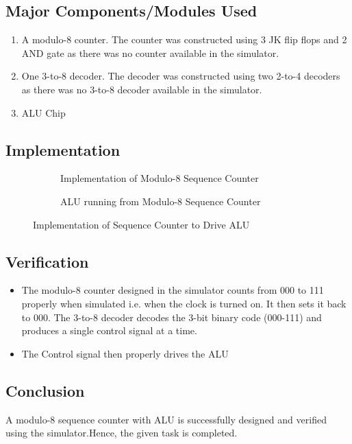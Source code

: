 \documentclass[a4paper]{article}
\begin{document}
\subsection{Major Components/Modules Used}
\begin{enumerate}
    \item A modulo-8 counter. The counter was constructed using 3 JK flip flops and 2 AND gate as there was no counter available in the simulator.
    \item One 3-to-8 decoder. The decoder was constructed using two 2-to-4 decoders as there was no 3-to-8 decoder available in the simulator.
    \item ALU Chip
\end{enumerate}

\subsection{Implementation}
\begin{figure}[h!]
    \centering
    \begin{subfigure}[b]{\linewidth}
        \centering
        \caption{Implementation of Modulo-8 Sequence Counter}
    \end{subfigure}
    \begin{subfigure}[b]{\linewidth}
        \centering
        \caption{ALU running from Modulo-8 Sequence Counter}
    \end{subfigure}
    \caption{Implementation of Sequence Counter to Drive ALU}
    \label{Fig:des-mod8}
\end{figure}

\subsection{Verification}
\begin{itemize}
    \item The modulo-8 counter designed in the simulator counts from 000 to 111 properly when simulated i.e. when the clock is turned on. It then sets it back to 000. The 3-to-8 decoder decodes the 3-bit binary code (000-111) and produces a single control signal at a time.
    \item The Control signal then properly drives the ALU 
\end{itemize}

\subsection{Conclusion}
A modulo-8 sequence counter with ALU is successfully designed and verified using the simulator.Hence, the given task is completed.
\end{document}
